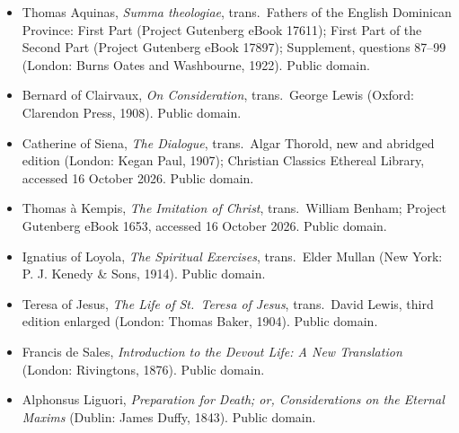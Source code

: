 {\fontsize{8.6}{9.6}\selectfont
\begin{itemize}[itemsep=0pt,parsep=0pt,topsep=0.05em]
\item Thomas Aquinas, \emph{Summa theologiae}, trans.\ Fathers of the English Dominican Province: First Part (Project Gutenberg eBook 17611); First Part of the Second Part (Project Gutenberg eBook 17897); Supplement, questions 87--99 (London: Burns Oates and Washbourne, 1922). Public domain.
\item Bernard of Clairvaux, \emph{On Consideration}, trans.\ George Lewis (Oxford: Clarendon Press, 1908). Public domain.
\item Catherine of Siena, \emph{The Dialogue}, trans.\ Algar Thorold, new and abridged edition (London: Kegan Paul, 1907); Christian Classics Ethereal Library, accessed 16 October 2026. Public domain.
\item Thomas \`a Kempis, \emph{The Imitation of Christ}, trans.\ William Benham; Project Gutenberg eBook 1653, accessed 16 October 2026. Public domain.
\item Ignatius of Loyola, \emph{The Spiritual Exercises}, trans.\ Elder Mullan (New York: P. J. Kenedy \& Sons, 1914). Public domain.
\item Teresa of Jesus, \emph{The Life of St.\ Teresa of Jesus}, trans.\ David Lewis, third edition enlarged (London: Thomas Baker, 1904). Public domain.
\item Francis de Sales, \emph{Introduction to the Devout Life: A New Translation} (London: Rivingtons, 1876). Public domain.
\item Alphonsus Liguori, \emph{Preparation for Death; or, Considerations on the Eternal Maxims} (Dublin: James Duffy, 1843). Public domain.
\end{itemize}}

\endgroup
